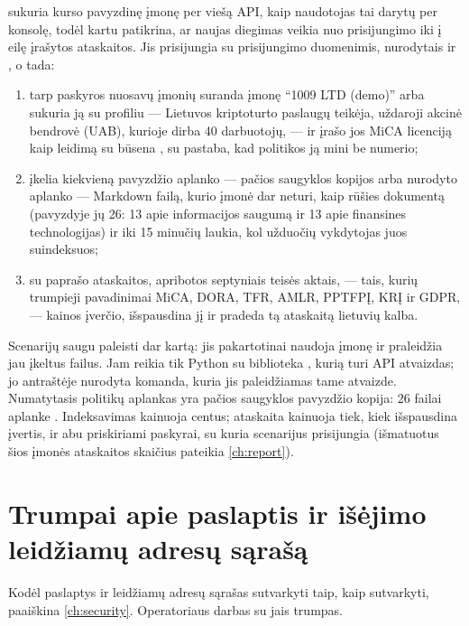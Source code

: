  sukuria kurso pavyzdinę įmonę per viešą API, kaip naudotojas tai
darytų per konsolę, todėl kartu patikrina, ar naujas diegimas veikia nuo prisijungimo iki į eilę
įrašytos ataskaitos. Jis prisijungia su prisijungimo duomenimis, nurodytais  ir
, o tada:

\begin{enumerate}
  \item tarp paskyros nuosavų įmonių suranda įmonę \enquote{1009 LTD (demo)} arba sukuria ją su
    profiliu --- Lietuvos kriptoturto paslaugų teikėja, uždaroji akcinė bendrovė (UAB), kurioje
    dirba 40 darbuotojų, --- ir įrašo jos MiCA licenciją kaip leidimą su būsena , su
    pastaba, kad politikos ją mini be numerio;
  \item įkelia kiekvieną pavyzdžio aplanko --- pačios saugyklos kopijos
     arba  nurodyto
    aplanko --- Markdown failą, kurio įmonė dar neturi,
    kaip  rūšies dokumentą (pavyzdyje jų 26: 13 apie informacijos saugumą ir 13 apie
    finansines technologijas) ir iki 15 minučių laukia, kol užduočių vykdytojas juos suindeksuos;
  \item su  paprašo ataskaitos, apribotos septyniais teisės aktais, --- tais, kurių
    trumpieji pavadinimai MiCA, DORA, TFR, AMLR, PPTFPĮ, KRĮ ir GDPR, --- kainos įverčio,
    išspausdina jį ir pradeda tą ataskaitą lietuvių kalba.
\end{enumerate}

Scenarijų saugu paleisti dar kartą: jis pakartotinai naudoja įmonę ir praleidžia jau įkeltus
failus. Jam reikia tik Python su biblioteka , kurią turi API atvaizdas; jo antraštėje
nurodyta komanda, kuria jis paleidžiamas tame atvaizde. Numatytasis politikų aplankas yra
pačios saugyklos pavyzdžio kopija: 26 failai aplanke
. Indeksavimas
kainuoja centus; ataskaita kainuoja tiek, kiek išspausdina įvertis, ir abu priskiriami paskyrai, su
kuria scenarijus prisijungia (išmatuotus šios įmonės ataskaitos skaičius pateikia \cref{ch:report}).


\section{Trumpai apie paslaptis ir išėjimo leidžiamų adresų sąrašą}\label{sec:ops:secrets}

Kodėl paslaptys ir leidžiamų adresų sąrašas sutvarkyti taip, kaip sutvarkyti, paaiškina
\cref{ch:security}. Operatoriaus darbas su jais trumpas.

